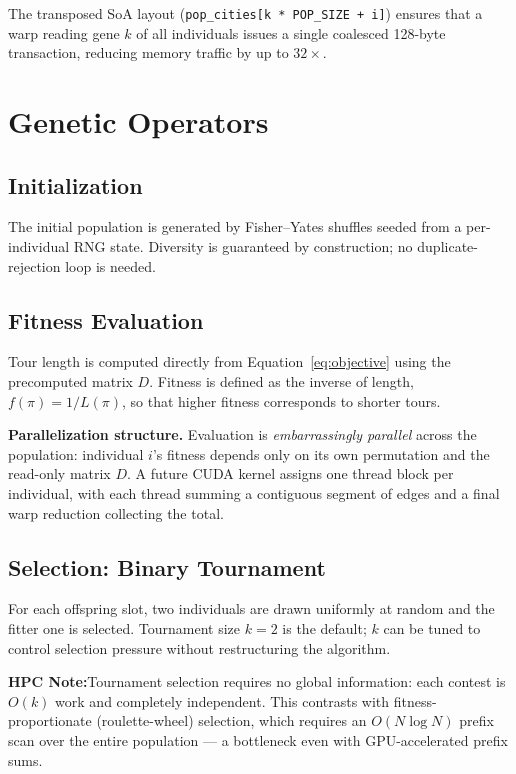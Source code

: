 \documentclass[11pt, letterpaper]{article}
\newcommand{\hpcnote}[1]{%
  \vspace{0.4em}
  \noindent\colorbox{blue!6}{\parbox{\dimexpr\linewidth-2\fboxsep}{%
    \footnotesize\textbf{HPC Note:}\enspace #1
  }}
  \vspace{0.4em}
}
\begin{document}
The transposed SoA layout (\texttt{pop\_cities[k * POP\_SIZE + i]}) ensures
that a warp reading gene $k$ of all individuals issues a single coalesced
128-byte transaction, reducing memory traffic by up to $32\times$.

\section{Genetic Operators}

\subsection{Initialization}

The initial population is generated by Fisher--Yates shuffles seeded from a
per-individual RNG state.  Diversity is guaranteed by construction; no
duplicate-rejection loop is needed.

\subsection{Fitness Evaluation}

Tour length is computed directly from Equation~\eqref{eq:objective} using the
precomputed matrix $D$.  Fitness is defined as the inverse of length,
$f(\pi) = 1/L(\pi)$, so that higher fitness corresponds to shorter tours.

\textbf{Parallelization structure.}  Evaluation is \emph{embarrassingly
parallel} across the population: individual $i$'s fitness depends only on its
own permutation and the read-only matrix $D$.  A future CUDA kernel assigns
one thread block per individual, with each thread summing a contiguous segment
of edges and a final warp reduction collecting the total.

\subsection{Selection: Binary Tournament}

For each offspring slot, two individuals are drawn uniformly at random and the
fitter one is selected.  Tournament size $k=2$ is the default; $k$ can be
tuned to control selection pressure without restructuring the algorithm.

\hpcnote{Tournament selection requires no global information: each contest is
$O(k)$ work and completely independent.  This contrasts with fitness-proportionate
(roulette-wheel) selection, which requires an $O(N \log N)$ prefix scan over
the entire population --- a bottleneck even with GPU-accelerated prefix sums.}
\end{document}
